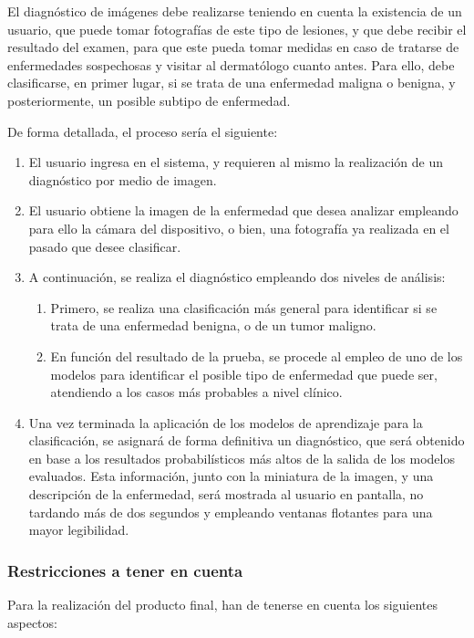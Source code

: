 El diagnóstico de imágenes debe realizarse teniendo en cuenta la existencia de un usuario, que puede tomar fotografías de este tipo de lesiones, y que debe recibir el resultado del examen, para que este pueda tomar medidas en caso de tratarse de enfermedades sospechosas y visitar al dermatólogo cuanto antes. Para ello, debe clasificarse, en primer lugar, si se trata de una enfermedad maligna o benigna, y posteriormente, un posible subtipo de enfermedad.

De forma detallada, el proceso sería el siguiente:

\begin{enumerate}
	\item El usuario ingresa en el sistema, y requieren al mismo la realización de un diagnóstico por medio de imagen.
	\item El usuario obtiene la imagen de la enfermedad que desea analizar empleando para ello la cámara del dispositivo, o bien, una fotografía ya realizada en el pasado que desee clasificar.
	\item A continuación, se realiza el diagnóstico empleando dos niveles de análisis: 
	\begin{enumerate}
		\item Primero, se realiza una clasificación más general para identificar si se trata de una enfermedad benigna, o de un tumor maligno.
		\item En función del resultado de la prueba, se procede al empleo de uno de los modelos para identificar el posible tipo de enfermedad que puede ser, atendiendo a los casos más probables a nivel clínico.
	\end{enumerate}
	\item Una vez terminada la aplicación de los modelos de aprendizaje para la clasificación, se asignará de forma definitiva un diagnóstico, que será obtenido en base a los resultados probabilísticos más altos de la salida de los modelos evaluados. Esta información, junto con la miniatura de la imagen, y una descripción de la enfermedad, será mostrada al usuario en pantalla, no tardando más de dos segundos y empleando ventanas flotantes para una mayor legibilidad.
\end{enumerate}

\subsubsection{Restricciones a tener en cuenta}

Para la realización del producto final, han de tenerse en cuenta los siguientes aspectos:

